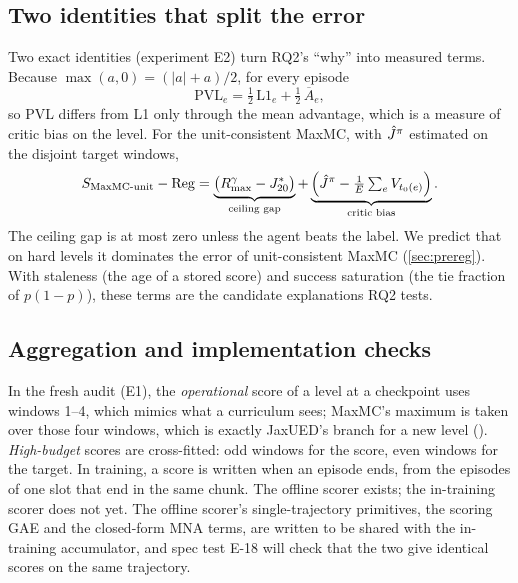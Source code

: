 \subsection{Two identities that split the error}
\label{sec:est-identities}

Two exact identities (experiment E2) turn RQ2's ``why'' into measured terms.
Because $\max(a, 0) = (|a| + a)/2$, for every episode
\begin{equation}
  \mathrm{PVL}_e = \tfrac12\,\mathrm{L1}_e + \tfrac12\,\overline{A}_e,
  \label{eq:pvl-identity}
\end{equation}
so PVL differs from L1 only through the mean advantage, which is a measure of critic bias
on the level. For the unit-consistent MaxMC, with $\hat{J}^{\pi}$ estimated on the disjoint
target windows,
\begin{equation}
  S_{\text{MaxMC-unit}} - \mathrm{Reg}
  = \underbrace{\big(R^{\gamma}_{\max} - J^{*}_{20}\big)}_{\text{ceiling gap}}
  + \underbrace{\Big(\hat{J}^{\pi} - \tfrac{1}{E}\textstyle\sum_e V_{t_0(e)}\Big)}_{\text{critic bias}}.
  \label{eq:maxmc-identity}
\end{equation}
The ceiling gap is at most zero unless the agent beats the label. We predict that on hard
levels it dominates the error of unit-consistent MaxMC (\cref{sec:prereg}). With staleness
(the age of a stored score) and success saturation (the tie fraction of $p(1-p)$), these
terms are the candidate explanations RQ2 tests.

\subsection{Aggregation and implementation checks}
\label{sec:est-aggregation}

In the fresh audit (E1), the \emph{operational} score of a level at a checkpoint uses
windows 1--4, which mimics what a curriculum sees; MaxMC's maximum is taken over those
four windows, which is exactly JaxUED's branch for a new level ().
\emph{High-budget} scores are cross-fitted: odd windows for the score, even windows for
the target. In training, a score is written when an episode ends, from the episodes of
one slot that end in the same chunk.
The offline scorer exists; the in-training scorer does not yet. The offline scorer's
single-trajectory primitives, the scoring GAE and the closed-form MNA terms, are written to
be shared with the in-training accumulator, and spec test E-18 will check that the two
give identical scores on the same trajectory.


